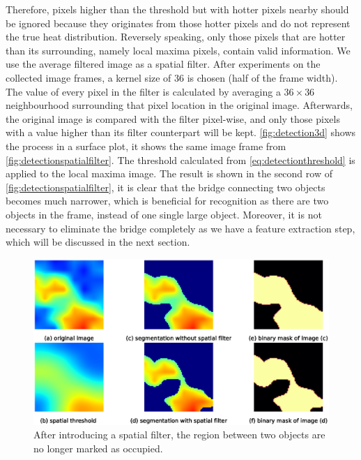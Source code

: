 Therefore, pixels higher than the threshold but with hotter pixels nearby should be ignored because they originates from those hotter pixels and do not represent the true heat distribution. Reversely speaking, only those pixels that are hotter than its surrounding, namely local maxima pixels, contain valid information. We use the average filtered image as a spatial filter. After experiments on the collected image frames, a kernel size of 36 is chosen (half of the frame width). The value of every pixel in the filter is calculated by averaging a $36\times36$ neighbourhood surrounding that pixel location in the original image. Afterwards, the original image is compared with the filter pixel-wise, and only those pixels with a value higher than its filter counterpart will be kept. \autoref{fig:detection3d} shows the process in a surface plot, it shows the same image frame from \autoref{fig:detectionspatialfilter}. The threshold calculated from \autoref{eq:detectionthreshold} is applied to the local maxima image. The result is shown in the second row of \autoref{fig:detectionspatialfilter}, it is clear that the bridge connecting two objects becomes much narrower, which is beneficial for recognition as there are two objects in the frame, instead of one single large object. Moreover, it is not necessary to eliminate the bridge completely as we have a feature extraction step, which will be discussed in the next section.
\begin{figure}
  \centering
  \includegraphics[width=\textwidth]{figures/detect_spatialfilter.eps}
  \caption{After introducing a spatial filter, the region between two objects are no longer marked as occupied.}\label{fig:detectionspatialfilter}
\end{figure}
